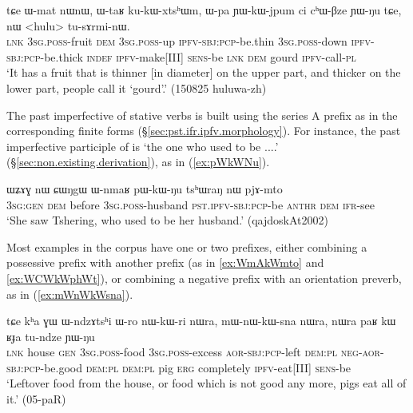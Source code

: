 \begin{exe}
\ex \label{ex:YWkWjpum2}
 \gll  tɕe ɯ-mat nɯnɯ, ɯ-taʁ ku-kɯ-xtsʰɯm, ɯ-pa ɲɯ-kɯ-jpum ci cʰɯ-βze ɲɯ-ŋu tɕe, nɯ <hulu> tu-sɤrmi-nɯ. \\
 \textsc{lnk} \textsc{3sg}.\textsc{poss}-fruit \textsc{dem} \textsc{3sg}.\textsc{poss}-up \textsc{ipfv}-\textsc{sbj}:\textsc{pcp}-be.thin \textsc{3sg}.\textsc{poss}-down \textsc{ipfv}-\textsc{sbj}:\textsc{pcp}-be.thick \textsc{indef} \textsc{ipfv}-make[III]  \textsc{sens}-be \textsc{lnk} \textsc{dem} gourd \textsc{ipfv}-call-\textsc{pl} \\
 \glt `It has a fruit that is thinner [in diameter] on the upper part, and thicker on the lower part, people call it `gourd'.' (150825 huluwa-zh)
\end{exe}

The past imperfective of stative verbs is built using the series A prefix  as in the corresponding finite forms (§\ref{sec:pst.ifr.ipfv.morphology}). For instance, the past imperfective participle of  is  `the one who used to be ....' (§\ref{sec:non.existing.derivation}), as in (\ref{ex:pWkWNu}).

\begin{exe}
\ex \label{ex:pWkWNu}
 \gll  ɯʑɤɣ nɯ ɕɯŋgɯ ɯ-nmaʁ pɯ-kɯ-ŋu tsʰɯraŋ nɯ pjɤ-mto \\
 \textsc{3sg}:\textsc{gen} \textsc{dem} before \textsc{3sg}.\textsc{poss}-husband \textsc{pst}.\textsc{ipfv}-\textsc{sbj}:\textsc{pcp}-be  \textsc{anthr} \textsc{dem} \textsc{ifr}-see \\
\glt `She saw Tshering, who used to be her husband.' (qajdoskAt2002)
\end{exe}

Most examples in the corpus have one or two prefixes, either combining a possessive prefix with another prefix (as in \ref{ex:WmAkWmto} and \ref{ex:WCWkWphWt}), or combining a negative prefix with an orientation preverb, as in (\ref{ex:mWnWkWsna}).

 \begin{exe}
\ex \label{ex:mWnWkWsna}
 \gll tɕe kʰa ɣɯ ɯ-ndzɤtsʰi ɯ-ro nɯ-kɯ-ri nɯra, mɯ-nɯ-kɯ-sna nɯra, nɯra paʁ kɯ ʁɟa tu-ndze ɲɯ-ŋu \\
 \textsc{lnk} house \textsc{gen} \textsc{3sg}.\textsc{poss}-food \textsc{3sg}.\textsc{poss}-excess \textsc{aor}-\textsc{sbj}:\textsc{pcp}-left \textsc{dem}:\textsc{pl}  \textsc{neg}-\textsc{aor}-\textsc{sbj}:\textsc{pcp}-be.good \textsc{dem}:\textsc{pl} \textsc{dem}:\textsc{pl} pig \textsc{erg} completely  \textsc{ipfv}-eat[III] \textsc{sens}-be \\
 \glt  `Leftover food from the house, or food which is not good any more, pigs eat all of it.' (05-paR)
\end{exe}

